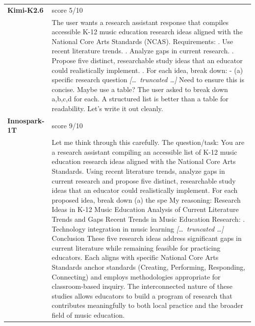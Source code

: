 \begin{longtable}{@{}l p{12.5cm}@{}}
  \midrule
  \textbf{Kimi-K2.6} & score 5/10 \\
  & The user wants a research assistant response that compiles accessible K-12 music education research ideas aligned with the National Core Arts Standards (NCAS). Requirements: \newline 1. Use recent literature trends. \newline 2. Analyze gaps in current research. \newline 3. Propose five distinct, researchable study ideas that an educator could realistically implement. \newline 4. For each idea, break down: \newline - (a) specific research question \newline \textit{[\ldots\ truncated \ldots]} \newline Need to ensure this is concise. Maybe use a table? The user asked to break down a,b,c,d for each. A structured list is better than a table for readability. \newline Let's write it out cleanly. \\
  \textbf{Innospark-1T} & score 9/10 \\
  & Let me think through this carefully. \newline The question/task: You are a research assistant compiling an accessible list of K-12 music education research ideas aligned with the National Core Arts Standards. Using recent literature trends, analyze gaps in current research and propose five distinct, researchable study ideas that an educator could realistically implement. For each proposed idea, break down (a) the spe \newline My reasoning: Research Ideas in K-12 Music Education \newline Analysis of Current Literature Trends and Gaps \newline Recent Trends in Music Education Research: \newline 1. Technology integration in music learning \newline \textit{[\ldots\ truncated \ldots]} \newline Conclusion \newline These five research ideas address significant gaps in current literature while remaining feasible for practicing educators. Each aligns with specific National Core Arts Standards anchor standards (Creating, Performing, Responding, Connecting) and employs methodologies appropriate for classroom-based inquiry. The interconnected nature of these studies allows educators to build a program of research that contributes meaningfully to both local practice and the broader field of music education. \\

\end{longtable}
